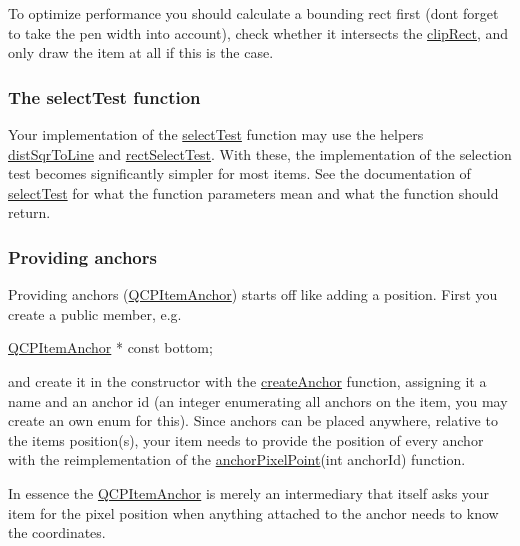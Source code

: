 To optimize performance you should calculate a bounding rect first (don\textquotesingle{}t forget to take the pen width into account), check whether it intersects the \hyperlink{class_q_c_p_abstract_item_a538e25ff8856534582f5b2b400a46405}{clip\+Rect}, and only draw the item at all if this is the case.\hypertarget{class_q_c_p_abstract_item_items-selection}{}\subsubsection{The select\+Test function}\label{class_q_c_p_abstract_item_items-selection}
Your implementation of the \hyperlink{class_q_c_p_abstract_item_a96d522d10ffc0413b9a366c6f7f0476b}{select\+Test} function may use the helpers \hyperlink{class_q_c_p_abstract_item_acdca343717d625b8abb3c3e38c0ed39d}{dist\+Sqr\+To\+Line} and \hyperlink{class_q_c_p_abstract_item_a4c0e14c4e92df91174cb7183fb363069}{rect\+Select\+Test}. With these, the implementation of the selection test becomes significantly simpler for most items. See the documentation of \hyperlink{class_q_c_p_abstract_item_a96d522d10ffc0413b9a366c6f7f0476b}{select\+Test} for what the function parameters mean and what the function should return.\hypertarget{class_q_c_p_abstract_item_anchors}{}\subsubsection{Providing anchors}\label{class_q_c_p_abstract_item_anchors}
Providing anchors (\hyperlink{class_q_c_p_item_anchor}{Q\+C\+P\+Item\+Anchor}) starts off like adding a position. First you create a public member, e.\+g.


\begin{DoxyCode}
\hyperlink{class_q_c_p_item_anchor}{QCPItemAnchor} * \textcolor{keyword}{const} bottom;
\end{DoxyCode}


and create it in the constructor with the \hyperlink{class_q_c_p_abstract_item_af3fc92527802078ca395138748b629a7}{create\+Anchor} function, assigning it a name and an anchor id (an integer enumerating all anchors on the item, you may create an own enum for this). Since anchors can be placed anywhere, relative to the item\textquotesingle{}s position(s), your item needs to provide the position of every anchor with the reimplementation of the \hyperlink{class_q_c_p_abstract_item_a94bde62b8a2fc133666dcbb8035deeed}{anchor\+Pixel\+Point}(int anchor\+Id) function.

In essence the \hyperlink{class_q_c_p_item_anchor}{Q\+C\+P\+Item\+Anchor} is merely an intermediary that itself asks your item for the pixel position when anything attached to the anchor needs to know the coordinates. 

